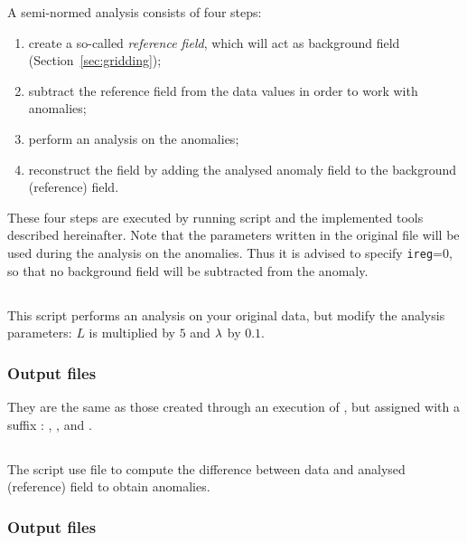 A semi-normed analysis consists of four steps:
\begin{enumerate}
\item create a so-called \textit{reference field}, which will act as background field (Section~\ref{sec:gridding});
\item subtract the reference field from the data values in order to work with anomalies;
\item perform an analysis on the anomalies;
\item reconstruct the field by adding the analysed anomaly field to the background (reference) field.
\end{enumerate}

These four steps are executed by running script  and the implemented tools described hereinafter. Note that the parameters written in the original  file will be used during the analysis on the anomalies. Thus it is advised to specify \texttt{ireg}=0, so that no background field will be subtracted from the anomaly. 

\subsection{}

This script performs an analysis on your original data, but modify the analysis parameters: $L$ is multiplied by $5$ and $\lambda$ by $0.1$. 

\subsubsection{Output files}

They are the same as those created through an execution of , but assigned with a suffix :
, ,  and .


\subsection{}

The script use file  to compute the difference between data and analysed (reference) field to obtain anomalies.

\subsubsection{Output files}


